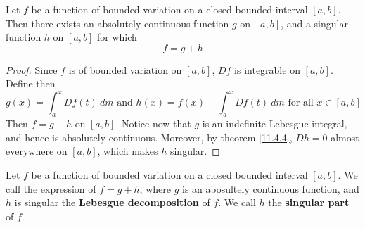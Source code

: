 \begin{lemma}\label{11.3.6}
    Let $f$ be a function of bounded variation on a closed bounded interval
    $[a,b]$. Then there exists an absolutely continuous function $g$ on
    $[a,b]$, and a singular function $h$ on  $[a,b]$ for which
    \begin{equation*}
        f=g+h
    \end{equation*}
\end{lemma}
\begin{proof}
    Since $f$ is of bounded variation on  $[a,b]$, $D{f}$ is integrable on
    $[a,b]$. Define then
    \begin{equation*}
        g(x)=\int_a^x{D{f(t)} \ dm} \text{ and }
        h(x)=f(x)-\int_a^x{D{f(t)} \ dm} \text{ for all } x \in [a,b]
    \end{equation*}
    Then $f=g+h$ on $[a,b]$. Notice now that $g$ is an indefinite Lebesgue
    integral, and hence is absolutely continuous. Moreover, by theorem
    \ref{11.4.4},  $D{h}=0$ almost everywhere on $[a,b]$, which makes $h$
    singular.
\end{proof}

\begin{definition}
    Let $f$ be a function of bounded variation on a closed bounded interval
    $[a,b]$. We call the expression of $f=g+h$, where $g$ is an abosultely
    continuous function, and  $h$ is singular the  \textbf{Lebesgue
    decomposition} of $f$. We call  $h$ the  \textbf{singular part} of $f$.
\end{definition}
